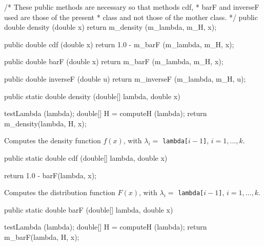 \begin{code}\begin{hide}
  /*  These public methods are necessary so that methods cdf,
   *  barF and inverseF used are those of the present
   *  class and not those of the mother class.
   */
   public double density (double x) {
      return m_density (m_lambda, m_H, x);
   }

   public double cdf (double x) {
      return 1.0 - m_barF (m_lambda, m_H, x);
   }

   public double barF (double x) {
      return m_barF (m_lambda, m_H, x);
   }

   public double inverseF (double u) {
      return m_inverseF (m_lambda, m_H, u);
   }\end{hide}

   public static double density (double[] lambda, double x)\begin{hide} {
      testLambda (lambda);
      double[] H = computeH (lambda);
      return m_density(lambda, H, x);
   }\end{hide}
\end{code}
  \begin{tabb} Computes the density function $f(x)$, with $\lambda_i = $
\texttt{lambda[$i-1$]}, $i = 1,\ldots,k$.
\end{tabb}
\begin{htmlonly}
\end{htmlonly}
\begin{code}

   public static double cdf (double[] lambda, double x)\begin{hide} {
      return 1.0 - barF(lambda, x);
   }\end{hide}
\end{code}
\begin{tabb}  Computes the distribution function $F(x)$,
with $\lambda_i = $ \texttt{lambda[$i-1$]}, $i = 1,\ldots,k$.
 \end{tabb}
\begin{htmlonly}
\end{htmlonly}
\begin{code}

   public static double barF (double[] lambda, double x)\begin{hide} {
      testLambda (lambda);
		double[] H = computeH (lambda);
      return m_barF(lambda, H, x);
   }\end{hide}
\end{code}
